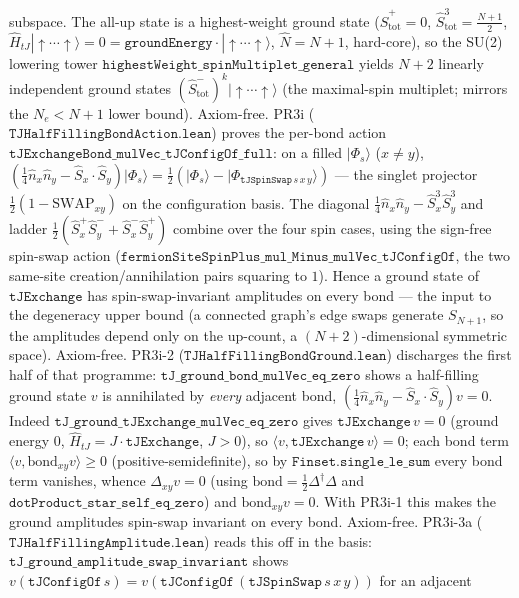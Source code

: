 \documentclass[a4paper,11pt]{article}
\begin{document}
subspace.  The all-up state is a highest-weight ground state ($\hat S^+_{\mathrm{tot}}=0$, $\hat
S^3_{\mathrm{tot}}=\tfrac{N+1}{2}$, $\hat H_{tJ}|{\uparrow\cdots\uparrow}\rangle=0=
\texttt{groundEnergy}\cdot|{\uparrow\cdots\uparrow}\rangle$, $\hat N=N{+}1$, hard-core), so the
SU(2) lowering tower $\texttt{highestWeight\_spinMultiplet\_general}$ yields $N{+}2$ linearly
independent ground states $(\hat S^-_{\mathrm{tot}})^k|{\uparrow\cdots\uparrow}\rangle$ (the
maximal-spin multiplet; mirrors the $N_e<N{+}1$ lower bound).  Axiom-free.  PR3i
($\texttt{TJHalfFillingBondAction.lean}$) proves the per-bond action
$\texttt{tJExchangeBond\_mulVec\_tJConfigOf\_full}$: on a filled $|\Phi_s\rangle$ ($x\ne y$),
$(\tfrac14\hat n_x\hat n_y-\hat S_x\!\cdot\!\hat S_y)|\Phi_s\rangle =
\tfrac12(|\Phi_s\rangle-|\Phi_{\texttt{tJSpinSwap}\,s\,x\,y}\rangle)$ --- the singlet projector
$\tfrac12(1-\mathrm{SWAP}_{xy})$ on the configuration basis.  The diagonal
$\tfrac14\hat n_x\hat n_y-\hat S^3_x\hat S^3_y$ and ladder
$\tfrac12(\hat S^+_x\hat S^-_y+\hat S^-_x\hat S^+_y)$ combine over the four spin cases, using the
sign-free spin-swap action ($\texttt{fermionSiteSpinPlus\_mul\_Minus\_mulVec\_tJConfigOf}$, the two
same-site creation/annihilation pairs squaring to $1$).  Hence a ground state of $\texttt{tJExchange}$
has spin-swap-invariant amplitudes on every bond --- the input to the degeneracy upper bound (a
connected graph's edge swaps generate $S_{N+1}$, so the amplitudes depend only on the up-count, a
$(N{+}2)$-dimensional symmetric space).  Axiom-free.  PR3i-2
($\texttt{TJHalfFillingBondGround.lean}$) discharges the first half of that programme:
$\texttt{tJ\_ground\_bond\_mulVec\_eq\_zero}$ shows a half-filling ground state $v$ is annihilated by
\emph{every} adjacent bond, $(\tfrac14\hat n_x\hat n_y-\hat S_x\!\cdot\!\hat S_y)v=0$.  Indeed
$\texttt{tJ\_ground\_tJExchange\_mulVec\_eq\_zero}$ gives $\texttt{tJExchange}\,v=0$ (ground energy
$0$, $\hat H_{tJ}=J\cdot\texttt{tJExchange}$, $J>0$), so $\langle v,\texttt{tJExchange}\,v\rangle=0$;
each bond term $\langle v,\text{bond}_{xy}v\rangle\ge 0$ (positive-semidefinite), so by
$\texttt{Finset.single\_le\_sum}$ every bond term vanishes, whence $\Delta_{xy}v=0$ (using
$\text{bond}=\tfrac12\Delta^\dagger\Delta$ and $\texttt{dotProduct\_star\_self\_eq\_zero}$) and
$\text{bond}_{xy}v=0$.  With PR3i-1 this makes the ground amplitudes spin-swap invariant on every
bond.  Axiom-free.  PR3i-3a ($\texttt{TJHalfFillingAmplitude.lean}$) reads this off in the basis:
$\texttt{tJ\_ground\_amplitude\_swap\_invariant}$ shows
$v(\texttt{tJConfigOf}\,s)=v(\texttt{tJConfigOf}\,(\texttt{tJSpinSwap}\,s\,x\,y))$ for an adjacent
\end{document}
